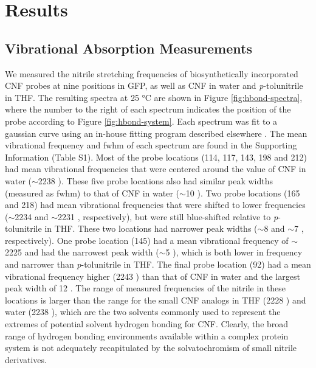 \section{Results}
\subsection{Vibrational Absorption Measurements}

We measured the nitrile stretching frequencies of biosynthetically incorporated CNF probes at nine positions in GFP, as well as CNF in water and \emph{p}-tolunitrile in THF.
The resulting spectra at 25 \si{\celsius} are shown in Figure \ref{fig:hbond-spectra}, where the number to the right of each spectrum indicates the position of the probe according to Figure \ref{fig:hbond-system}.
Each spectrum was fit to a gaussian curve using an in-house fitting program described elsewhere \cite{Ragain2012}.
The mean vibrational frequency and fwhm of each spectrum are found in the Supporting Information (Table S1).
Most of the probe locations (114, 117, 143, 198 and 212) had mean vibrational frequencies that were centered around the value of CNF in water ($\sim$2238 \si{\wn}).
These five probe locations also had similar peak widths (measured as fwhm) to that of CNF in water ($\sim$10 \si{\wn}).
Two probe locations (165 and 218) had mean vibrational frequencies that were shifted to lower frequencies ($\sim$2234 \si{\wn} and $\sim$2231 \si{\wn}, respectively), but were still blue-shifted relative to \emph{p}-tolunitrile in THF.
These two locations had narrower peak widths ($\sim$8 \si{\wn} and $\sim$7 \si{\wn}, respectively).
One probe location (145) had a mean vibrational frequency of $\sim$2225 \si{\wn} and had the narrowest peak width ($\sim$5 \si{\wn}), which is both lower in frequency and narrower than \emph{p}-tolunitrile in THF.
The final probe location (92) had a mean vibrational frequency higher (2243 \si{\wn}) than that of CNF in water and the largest peak width of 12 \si{\wn}.
The range of measured frequencies of the nitrile in these locations is larger than the range for the small CNF analogs in THF (2228 \si{\wn}) and water (2238 \si{\wn}), which are the two solvents commonly used to represent the extremes of potential solvent hydrogen bonding for CNF.
Clearly, the broad range of hydrogen bonding environments available within a complex protein system is not adequately recapitulated by the solvatochromism of small nitrile derivatives. 

